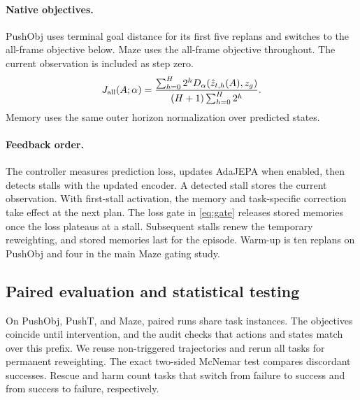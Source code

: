\paragraph{Native objectives.}
PushObj uses terminal goal distance for its first five replans and switches to the all-frame objective below. Maze uses the all-frame objective throughout. The current observation is included as step zero.
\begin{equation}
J_{\rm all}(A;\alpha)=
\frac{\sum_{h=0}^{H}2^h D_\alpha(\hat z_{t,h}(A),z_g)}
     {(H+1)\sum_{h=0}^{H}2^h}.
\label{eq:baseexact}
\end{equation}
Memory uses the same outer horizon normalization over predicted states.

\paragraph{Feedback order.}
The controller measures prediction loss, updates AdaJEPA when enabled, then detects stalls with the updated encoder. A detected stall stores the current observation. With first-stall activation, the memory and task-specific correction take effect at the next plan. The loss gate in \cref{eq:gate} releases stored memories once the loss plateaus at a stall. Subsequent stalls renew the temporary reweighting, and stored memories last for the episode. Warm-up is ten replans on PushObj and four in the main Maze gating study.

\subsection{Paired evaluation and statistical testing}
\label{sec:paired}
On PushObj, PushT, and Maze, paired runs share task instances. The objectives coincide until intervention, and the audit checks that actions and states match over this prefix. We reuse non-triggered trajectories and rerun all tasks for permanent reweighting. The exact two-sided McNemar test compares discordant successes. Rescue and harm count tasks that switch from failure to success and from success to failure, respectively.



